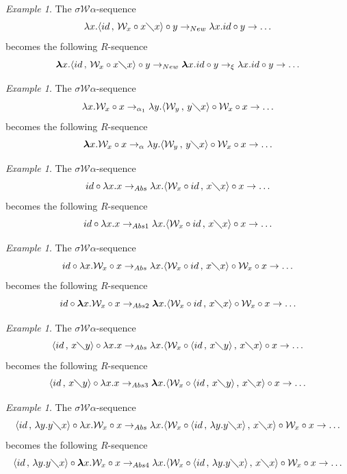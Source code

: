\documentclass[11pt]{amsart}
\theoremstyle{plain}
\theoremstyle{definition}
\theoremstyle{remark}
\newtheorem{example}[theorem]{Example}
\numberwithin{equation}{section}
\newcommand{\ci}{\circ}
\newcommand{\mi}{\,,\,}
\newcommand{\is}{\diagdown}
\newcommand{\arrow}{\rightarrow}
\newcommand{\la}{\langle}
\newcommand{\ra}{\rangle}
\renewcommand{\pi}{\mathcal{W}}
\begin{document}
\begin{example}\label{example1.18}The $\sigma\pi\alpha$-sequence
$$\lambda x.\la id\mi\pi_x\ci x\is x\ra\ci y\arrow_{New}\lambda
x.id\ci y\arrow\ldots$$
 becomes the following $R$-sequence
$$\boldsymbol{\lambda} x.\la id\mi\pi_x\ci x\is x\ra\ci
y\arrow_{New} \boldsymbol{\lambda} x.id\ci y \arrow_{\xi}\lambda
x.id\ci y\arrow\ldots$$
\end{example}
\begin{example}\label{example1.13}The $\sigma\pi\alpha$-sequence
 $$\lambda x.\pi_x\ci
 x\arrow_{\alpha_1}\lambda y.\la\pi_y\mi y\is
 x\ra\ci\pi_x\ci x\arrow\ldots$$
  becomes the following  $R$-sequence
 $$\boldsymbol{\lambda} x.\pi_x\ci x\arrow_{\alpha}\lambda y.\la\pi_y\mi y\is
 x\ra\ci\pi_x\ci x\arrow\ldots$$
 \end{example}
\begin{example}\label{example1.14}The $\sigma\pi\alpha$-sequence
$$id\ci\lambda x.x\arrow_{Abs}\lambda x.\la\pi_x\ci id\mi x\is
x\ra\ci x\arrow\ldots$$
 becomes the following  $R$-sequence
$$ id\ci\lambda x.x\arrow_{Abs1}\lambda x.\la\pi_x\ci id\mi x\is
x\ra\ci x\arrow\ldots$$
\end{example}
\begin{example}\label{example1.15}The $\sigma\pi\alpha$-sequence
$$id\ci\lambda x.\pi_x\ci x\arrow_{Abs}\lambda x.\la\pi_x\ci id\mi
x\is x\ra\ci\pi_x\ci x\arrow\ldots$$
 becomes the following
$R$-sequence
$$id\ci\boldsymbol{\lambda} x.\pi_x\ci
x\arrow_{Abs2}\boldsymbol{\lambda} x.\la\pi_x\ci id\mi x\is
x\ra\ci\pi_x\ci x\arrow\ldots$$
\end{example}
\begin{example}\label{example1.16}The $\sigma\pi\alpha$-sequence
$$\la id\mi x\is y\ra\ci\lambda x.x\arrow_{Abs}\lambda
x.\la\pi_x\ci\la id\mi x\is y\ra\mi x\is x\ra\ci x\arrow\ldots$$
becomes the following  $R$-sequence
$$\la id\mi x\is
y\ra\ci\lambda x.x\arrow_{Abs3} \boldsymbol{\lambda}
x.\la\pi_x\ci\la id\mi x\is y\ra\mi x\is x\ra\ci x\arrow\ldots$$
\end{example}
\begin{example}\label{example1.17}The $\sigma\pi\alpha$-sequence
$$\la id\mi\lambda y.y\is x\ra\ci\lambda x.\pi_x\ci
x\arrow_{Abs}\lambda x.\la\pi_x\ci\la id\mi\lambda y.y\is x\ra\mi
x\is x\ra\ci\pi_x\ci x\arrow\ldots$$
 becomes the following
$R$-sequence
$$\la id\mi\lambda y.y\is x\ra\ci\boldsymbol{\lambda}
x.\pi_x\ci x\arrow_{Abs4}\lambda x.\la\pi_x\ci\la id\mi\lambda
y.y\is x\ra\mi x\is x\ra\ci\pi_x\ci x\arrow\ldots$$
\end{example}
\end{document}

